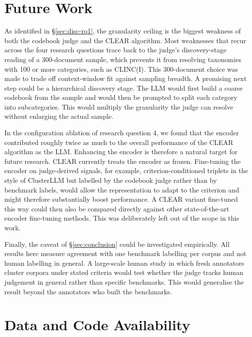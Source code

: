\documentclass[11pt,a4paper,oneside]{report}
\begin{document}
\section{Future Work}

As identified in \S\ref{sec:disc-rq1}, the granularity ceiling is the biggest weakness of both the codebook judge and the CLEAR algorithm. Most weaknesses that recur across the four research questions trace back to the judge's discovery-stage reading of a 300-document sample, which prevents it from resolving taxonomies with 100 or more categories, such as CLINC(I). This 300-document choice was made to trade off context-window fit against sampling breadth. A promising next step could be a hierarchical discovery stage. The LLM would
first build a coarse codebook from the sample and would then be prompted to split
each category into subcategories. This would multiply the granularity the judge can resolve
without enlarging the actual sample.


In the configuration ablation of research question 4, we found that the encoder contributed roughly twice as much to the overall performance of the CLEAR algorithm as the LLM. Enhancing the encoder is therefore a natural target for future research. CLEAR currently treats the encoder as frozen. Fine-tuning
the encoder on judge-derived signals, for example, criterion-conditioned triplets in the style of ClusterLLM but labelled by the codebook judge rather than by benchmark labels,
would allow the representation to adapt to the criterion and might therefore substantially boost performance. A CLEAR variant fine-tuned this way could then also be compared directly
against other state-of-the-art encoder fine-tuning methods. This was deliberately left out of the scope in this work. 


Finally, the caveat of \S\ref{sec:conclusion} could be investigated empirically. All results here measure agreement with one benchmark labelling per corpus and not human labelling in general. A large-scale human study in which fresh annotators cluster corpora under stated criteria would
test whether the judge tracks human judgement in general rather than specific benchmarks. This would generalise the result beyond the annotators who built the benchmarks.





\section*{Data and Code Availability}
\end{document}
